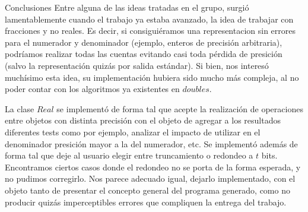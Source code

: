 \begin{section}{Conclusiones}
	Entre alguna de las ideas tratadas en el grupo, surgió lamentablemente cuando el trabajo ya estaba avanzado, la idea de trabajar con fracciones y no reales. Es decir, si consiguiéramos una representacion sin errores para el numerador y denominador (ejemplo, enteros de precisión arbitraria), podríamos realizar todas las cuentas evitando casi toda pérdida de presición (salvo la representación quizás por salida estándar). Si bien, nos interesó muchísimo esta idea, su implementación hubiera sido mucho más compleja, al no poder contar con los algoritmos ya existentes en $doubles$.
	
	La clase $Real$ se implementó de forma tal que acepte la realización de operaciones entre objetos con distinta precisión con el objeto de agregar a los resultados diferentes tests como por ejemplo, analizar el impacto de utilizar en el denominador presición mayor a la del numerador, etc. Se implementó además de forma tal que deje al usuario elegir entre truncamiento o redondeo a $t$ bits. Encontramos ciertos casos donde el redondeo no se porta de la forma esperada, y no pudimos corregirlo. Nos parece adecuado igual, dejarlo implementado, con el objeto tanto de presentar el concepto general del programa generado, como no producir quizás imperceptibles errores que compliquen la entrega del trabajo. 

\end{section}
